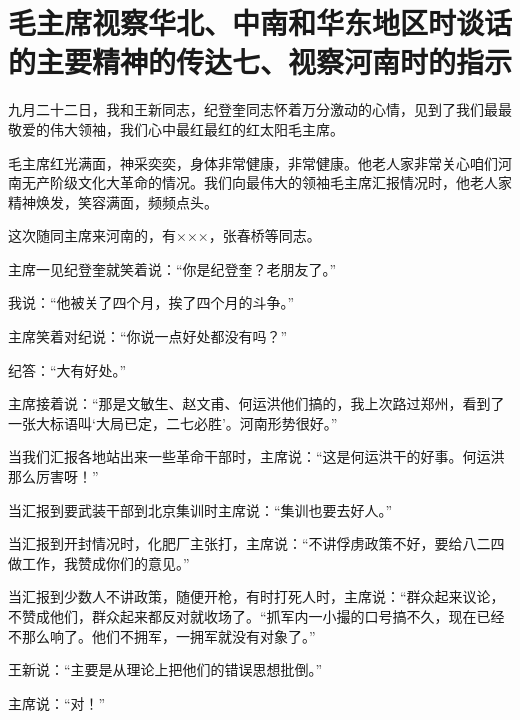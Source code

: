 \section[毛主席视察华北、中南和华东地区时谈话的主要精神的传达七、视察河南时的指示]{毛主席视察华北、中南和华东地区时谈话的主要精神的传达七、视察河南时的指示}


九月二十二日，我和王新同志，纪登奎同志怀着万分激动的心情，见到了我们最最敬爱的伟大领袖，我们心中最红最红的红太阳毛主席。

毛主席红光满面，神采奕奕，身体非常健康，非常健康。他老人家非常关心咱们河南无产阶级文化大革命的情况。我们向最伟大的领袖毛主席汇报情况时，他老人家精神焕发，笑容满面，频频点头。

这次随同主席来河南的，有×××，张春桥等同志。

主席一见纪登奎就笑着说：“你是纪登奎？老朋友了。”

我说：“他被关了四个月，挨了四个月的斗争。”

主席笑着对纪说：“你说一点好处都没有吗？”

纪答：“大有好处。”

主席接着说：“那是文敏生、赵文甫、何运洪他们搞的，我上次路过郑州，看到了一张大标语叫‘大局已定，二七必胜’。河南形势很好。”

当我们汇报各地站出来一些革命干部时，主席说：“这是何运洪干的好事。何运洪那么厉害呀！”

当汇报到要武装干部到北京集训时主席说：“集训也要去好人。”

当汇报到开封情况时，化肥厂主张打，主席说：“不讲俘虏政策不好，要给八二四做工作，我赞成你们的意见。”

当汇报到少数人不讲政策，随便开枪，有时打死人时，主席说：“群众起来议论，不赞成他们，群众起来都反对就收场了。“抓军内一小撮的口号搞不久，现在已经不那么响了。他们不拥军，一拥军就没有对象了。”

王新说：“主要是从理论上把他们的错误思想批倒。”

主席说：“对！”

